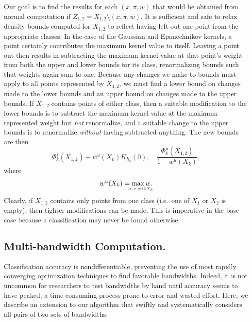 \documentclass[twoside,leqno,twocolumn]{article}
\newcommand{\lo}[1]{#1^{\,l}}
\newcommand{\hi}[1]{#1^u}
\newcommand{\leftlim}[1]{\lefteqn{\scriptscriptstyle #1}}
\begin{document}
Our goal is to find the results for each $(x,\pi,w)$ that would be
obtained from normal computation if $Z_{1,2} = X_{1,2} \setminus
(x,\pi,w)$.  It is sufficient and safe to relax density bounds
computed for $X_{1,2}$ to reflect having left out one point from the
appropriate classes.  In the case of the Gaussian and Epanechnikov
kernels, a point certainly contributes the maximum kernel value to
itself.  Leaving a point out then results in subtracting the maximum
kernel value at that point's weight from both the upper and lower
bounds for its class, renormalizing bounds such that weights again sum
to one.  Because any changes we make to bounds must apply to all
points represented by $X_{1,2}$, we must find a lower bound on changes
made to the lower bounds and an upper bound on changes made to the
upper bounds.  If $X_{1,2}$ contains points of either class, then a
suitable modification to the lower bounds is to subtract the maximum
kernel value at the maximum represented weight but {\em not}
renormalize, and a suitable change to the upper bounds is to
renormalize {\em without} having subtracted anything.  The new bounds
are then
\begin{equation}
  \lo{\Phi_k}(X_{1,2}) - \hi{w}(X_k) K_{h_k}(0) , \quad \frac{\hi{\Phi_k}(X_{1,2})}{1 - \hi{w}(X_k)} ,
\end{equation}
where
\begin{equation}
  \hi{w}(X_k) = \max_{\leftlim{(x,\pi,w) \in X_k}} w .
\end{equation}
Clearly, if $X_{1,2}$ contains only points from one class (i.e.~one of
$X_1$ or $X_2$ is empty), then tighter modifications can be made.
This is imperative in the base-case because a classification may never
be found otherwise.

\subsection{Multi-bandwidth Computation.}
Classification accuracy is nondifferentiable, preventing the use of
most rapidly converging optimization techniques to find favorable
bandwidths.  Indeed, it is not uncommon for researchers to test
bandwidths by hand until accuracy seems to have peaked, a
time-consuming process prone to error and wasted effort.  Here, we
describe an extension to our algorithm that swiftly and systematically
considers all pairs of two sets of bandwidths.
\end{document}
